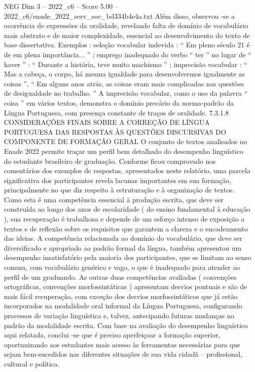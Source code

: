 \begin{textsample}{NEG Dim 3 – 2022\_c6 – Score 5.00 – 2022\_c6/enade\_2022\_serv\_soc\_bd334b4e4a.txt}
Além disso, observou -se a ocorrência de expressões da oralidade, revelando falta de domínio de vocabulário mais abstrato e de maior complexidade, essencial ao desenvolvimento do texto de base dissertativa.
Exemplos : seleção vocabular indevida : “ Em pleno século 21 é de em plena importância... ” ; emprego inadequado do verbo “ ter ” no lugar de “ haver ” : “ Durante a história, teve muito machismo ” ; imprecisão vocabular : “ Mas a cabeça, o corpo, há mesma igualdade para desenvolvermos igualmente as coisas ”, “ Em alguns anos atrás, as coisas eram mais complicadas nas questões de desigualdade no trabalho. ” A imprecisão vocabular, como o uso da palavra “ coisa ” em vários textos, demonstra o domínio precário da norma-padrão da Língua Portuguesa, com presença constante de traços de oralidade. 7.3.1.8 CONSIDERAÇÕES FINAIS SOBRE A CORREÇÃO DE LÍNGUA PORTUGUESA DAS RESPOSTAS ÀS QUESTÕES DISCURSIVAS DO COMPONENTE DE FORMAÇÃO GERAL O conjunto de textos analisados no Enade 2022 permite traçar um perfil bem detalhado do desempenho linguístico do estudante brasileiro de graduação.
Conforme ficou comprovado nos comentários dos exemplos de respostas, apresentados neste relatório, uma parcela significativa dos participantes revela lacunas importantes em sua formação, principalmente no que diz respeito à estruturação e à organização de textos.
Como esta é uma competência essencial à produção escrita, que deve ser construída ao longo dos anos de escolaridade ( do ensino fundamental à educação ), sua recuperação é trabalhosa e depende de um esforço intenso de exposição a textos e de reflexão sobre os requisitos que garantem a clareza e o encadeamento das ideias.
A competência relacionada ao domínio do vocabulário, que deve ser diversificado e apropriado ao padrão formal da língua, também apresentou um desempenho insatisfatório pela maioria dos participantes, que se limitam ao senso comum, com vocabulário genérico e vago, o que é inadequado para atender ao perfil de um graduando.
As outras duas competências avaliadas ( convenções ortográficas, convenções morfossintáticas ) apresentam desvios pontuais e são de mais fácil recuperação, com exceção dos desvios morfossintáticos que já estão incorporados na modalidade oral informal da Língua Portuguesa, configurando processos de variação linguística e, talvez, antecipando futuras mudanças no padrão da modalidade escrita.
Com base na avaliação do desempenho linguístico aqui relatada, conclui -se que é preciso aperfeiçoar a formação superior, oportunizando aos estudantes mais acesso às ferramentas necessárias para que sejam bem-sucedidos nas diferentes situações de sua vida cidadã – profissional, cultural e política.

\end{textsample}
